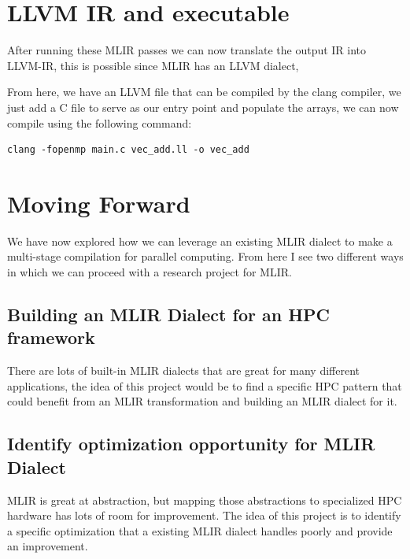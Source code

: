 \section*{LLVM IR and executable}

After running these MLIR passes we can now translate the output IR into LLVM-IR, this is possible since MLIR has an LLVM dialect, 

From here, we have an LLVM file that can be compiled by the clang compiler, we just add a C file to serve as our entry point and populate the arrays, we can now compile using the following command:

\begin{verbatim}
clang -fopenmp main.c vec_add.ll -o vec_add
\end{verbatim}

\section*{Moving Forward}

We have now explored how we can leverage an existing MLIR dialect to make a multi-stage compilation for parallel computing. From here I see two different ways in which we can proceed with a research project for MLIR.

\subsection*{Building an MLIR Dialect for an HPC framework}
There are lots of built-in MLIR dialects that are great for many different applications, the idea of this project would be to find a specific HPC pattern that could benefit from an MLIR transformation and building an MLIR dialect for it.

\subsection*{Identify optimization opportunity for MLIR Dialect}
MLIR is great at abstraction, but mapping those abstractions to specialized HPC hardware has lots of room for improvement. The idea of this project is to identify a specific optimization that a existing MLIR dialect handles poorly and provide an improvement.


